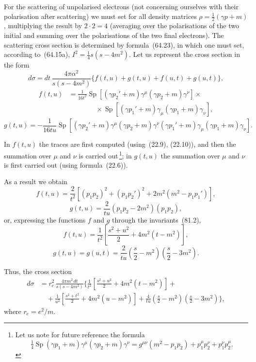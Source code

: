 For the scattering of unpolarised electrons (not concerning ourselves with their polarisation after scattering) we must set for all density matrices $\rho = \frac{1}{2}(\gamma p + m)$, multiplying the result by $2\cdot 2 = 4$ (averaging over the polarisations of the two initial and summing over the polarisations of the two final electrons). The scattering cross section is determined by formula~(64.23), in which one must set, according to~(64.15a), $I^2 = \frac{1}{4}s(s - 4m^2)$. Let us represent the cross section in the form
\begin{equation}
d\sigma = dt\,\frac{4\pi\alpha^2}{s(s - 4m^2)}\{f(t,u) + g(t,u) + f(u,t) + g(u,t)\},
\tag{81.5}
\end{equation}
\begin{equation}
\begin{split}
f(t,u) &= \frac{1}{16t^2}\operatorname{Sp}[(\gamma p_2' + m)\gamma^\mu(\gamma p_2 + m)\gamma^\nu]\times\\
&\qquad\qquad\times\operatorname{Sp}[(\gamma p_1' + m)\gamma_\mu(\gamma p_1 + m)\gamma_\nu],
\end{split}
\end{equation}
\begin{equation}
g(t,u) = -\frac{1}{16tu}\operatorname{Sp}[(\gamma p_2' + m)\gamma^\mu(\gamma p_2 + m)\gamma^\nu(\gamma p_1' + m)\gamma_\mu(\gamma p_1 + m)\gamma_\nu].
\end{equation}

In $f(t,u)$ the traces are first computed (using~(22.9), (22.10)), and then the summation over $\mu$ and $\nu$ is carried out\,\footnote{Let us note for future reference the formula
\[
\tfrac{1}{4}\operatorname{Sp}(\gamma p_1 + m)\gamma^\mu(\gamma p_2 + m)\gamma^\nu = g^{\mu\nu}(m^2 - p_1 p_2) + p_1^\mu p_2^\nu + p_1^\nu p_2^\mu.
\]}; in $g(t,u)$ the summation over $\mu$ and $\nu$ is first carried out (using formula~(22.6)).

As a result we obtain
\[
f(t,u) = \frac{2}{t^2}[(p_1 p_2)^2 + (p_1 p_2')^2 + 2m^2(m^2 - p_1 p_1')],
\]
\[
g(t,u) = \frac{2}{tu}(p_1 p_2 - 2m^2)(p_1 p_2),
\]
or, expressing the functions $f$ and $g$ through the invariants~(81.2),
\begin{equation}
f(t,u) = \frac{1}{t^2}\left[\frac{s^2 + u^2}{2} + 4m^2(t - m^2)\right],
\tag{81.6}
\end{equation}
\[
g(t,u) = g(u,t) = \frac{2}{tu}\left(\frac{s}{2} - m^2\right)\left(\frac{s}{2} - 3m^2\right).
\]

Thus, the cross section
\begin{equation}
\begin{split}
d\sigma &= r_e^2\,\frac{4\pi m^2\,dt}{s(s-4m^2)}\bigg\{\frac{1}{t^2}\left[\frac{s^2+u^2}{2}+4m^2(t-m^2)\right]+{}\\
&\quad+\frac{1}{u^2}\left[\frac{s^2+t^2}{2}+4m^2(u-m^2)\right]+\frac{4}{tu}\left(\frac{s}{2}-m^2\right)\left(\frac{s}{2}-3m^2\right)\bigg\},
\end{split}
\tag{81.7}
\end{equation}
where $r_e = e^2/m$.

